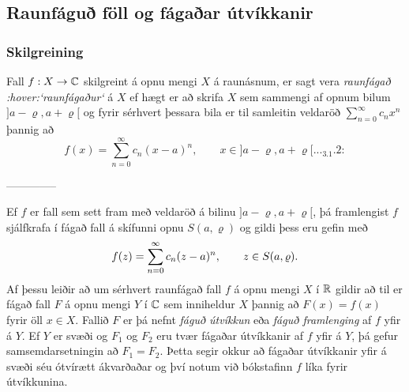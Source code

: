 \subsection*{Raunfáguð föll og fágaðar útvíkkanir}

\subsubsection{Skilgreining}
Fall $f:X\to {\mathbb C}$ skilgreint á opnu mengi $X$ á raunásnum,  er sagt
vera {\it raunfágað :hover:`raunfágaður`} á $X$ ef hægt er að skrifa $X$
sem sammengi af opnum bilum $]a-\varrho,a+\varrho[$  og fyrir sérhvert
þessara bila er  til samleitin veldaröð $\sum_{n=0}^\infty c_nx^n$
þannig að
\begin{equation*}f(x)= \sum\limits_{n=0}^\infty c_n(x-a)^n, \qquad x\in
]a-\varrho,a+\varrho[.


.. _3.1.2:

\end{equation*}


--------------



Ef $f$ er fall sem sett fram með veldaröð á bilinu
$]a-\varrho,a+\varrho[$, þá framlengist $f$ sjálfkrafa í fágað fall
á skífunni opnu $S(a,\varrho)$ og gildi þess eru gefin með 
$$f(z)=\sum\limits_{n=0}\sp\infty c_n(z-a)\sp n, \qquad z\in
S(a,\varrho).
$$
Af þessu leiðir að um sérhvert raunfágað fall $f$ á opnu mengi $X$ í
${\mathbb R}$ gildir að til er fágað fall $F$ á opnu mengi $Y$ í ${\mathbb C}$ sem
inniheldur $X$ þannig að $F(x)=f(x)$ fyrir öll $x\in X$. 
Fallið $F$ er þá nefnt {\it fáguð útvíkkun} eða {\it fáguð
framlenging}  af $f$ yfir á $Y$.  Ef $Y$ er svæði og $F_1$ og $F_2$ eru
tvær fágaðar útvíkkanir  af $f$ yfir á $Y$, þá gefur
samsemdarsetningin  að $F_1=F_2$.  Þetta segir okkur að fágaðar
útvíkkanir  yfir á svæði séu ótvírætt ákvarðaðar og því notum við
bókstafinn $f$ líka fyrir útvíkkunina. 

